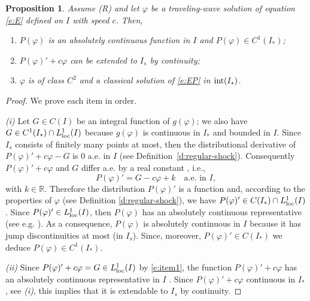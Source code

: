 \documentclass[11pt,a4paper]{article}
\newtheorem{proposition}{Proposition}[section]
\renewcommand{\phi}{\varphi}
\begin{document}
\begin{proposition}\label{p:Pconditions}
Assume {\rm (R)} and let $\phi$ be a traveling-wave solution of equation \eqref{e:E} defined on $I$ with speed $c$. Then, 
\begin{enumerate}[label=(\roman*)]
\item $P(\phi)$ is an absolutely continuous function in $I$ and $P(\phi) \in C^1(I_*)$;
\item $P(\phi)'+c\phi$ can be extended to $I_{s}$ by continuity;  
\item $\phi$ is of class $C^2$ and a classical solution of \eqref{e:EP} in ${\rm int}(I_*)$.
\end{enumerate}
\end{proposition}
%
\begin{proof} We prove each item in order.

\smallskip

{\em (i)} Let $G\in C(I)$ be an integral function of $g(\phi)$; we also have $G \in C^1(I_*)\cap L^1_{\rm loc}(I)$ because $g(\phi)$ is continuous in  $I_*$ and bounded in $I$. 
Since  $I_{s}$ consists of finitely many  points at most, then the distributional derivative of $P(\phi)'+c\phi-G$ is $0$ a.e.\! in $I$ (see  Definition~\ref{d:regular-shock}). Consequently $P(\phi)'+c\phi$ and $G$ differ a.e.\!  by a real constant \cite{Schwartz}, i.e.,
\begin{equation}\label{e:item1}
P(\phi)'=G-c\phi +k\quad \text{a.e. in }  I,
\end{equation}
with $k \in \mathbb{R}$. 
Therefore the distribution  $P(\phi)'$ is a function and, according to the properties of $\phi$ (see Definition \ref{d:regular-shock}), we have $P(\phi)'\in C(I_*)\cap L^1_{\rm loc}(I)$. Since $P(\phi)' \in  L^1_{\rm loc}(I)$, then $P(\phi)$ has an absolutely continuous representative (see e.g. \cite[Thm. 8.2]{Brezis}). As a consequence, $P(\phi)$ is absolutely continuous in $I$ because it has jump discontinuities at most (in $I_{s}$). Since, moreover,  $P(\phi)' \in C(I_*)$ we deduce $P(\phi) \in C^1(I_*)$.

\smallskip

{\em (ii)} Since  $P(\phi)'+c\phi=G \in L^1_{\rm loc}(I)$ by \eqref{e:item1},  the function   $P(\phi)'+c\phi$ has an absolutely  continuous representative in $I$ \cite[Thm. 8.2]{Brezis}. Since $P(\phi)'+c\phi$ continuous in $I_*$, see {\em (i)}, this implies that it is extendable to $I_{s}$ by continuity.

\smallskip


\end{proof}
\end{document}
